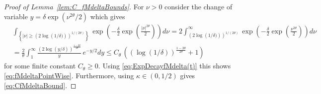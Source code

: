 \documentclass[11pt]{amsart}
\newcommand{\1}{\mathbbm{1}}
\theoremstyle{plain}
\theoremstyle{definition}
\theoremstyle{remark}
\numberwithin{equation}{section}
\begin{document}
\begin{proof} [Proof of Lemma~\ref{lem:C_fMdeltaBounds}]
For $\nu>0$  consider the change of variable $y = \delta\exp\left(\nu^{2\theta}/2\right)$ which gives
\begin{align*}
  &\int_{\left\{|\nu|\ge (2\log\left(1/\delta)\right))^{1/(2\theta)}\right\}} \exp\left(-\frac{\delta}{2}\exp\left(\frac{|\nu|^{2\theta}}{2}\right)\right)d\nu =2\int^{\infty}_{(2\log\left(1/\delta)\right))^{1/(2\theta)}} \exp\left(-\frac{\delta}{2}\exp\left(\frac{\nu^{2\theta}}{2}\right)\right)d\nu\\&=\frac{2}{\theta}\int^{\infty}_{1} \frac{(2\log(y/\delta))^{\tfrac{1-2\theta}{2\theta}}}{y}\,e^{-y/2}dy  \le C_\theta\,\left( (\log(1/\delta))^{\tfrac{1-2\theta}{2\theta}} +1\right)
\end{align*}
for some finite constant $C_\theta\ge 0.$ Using \eqref{eq:ExpDecayfMdelta(t)} this shows \eqref{eq:fMdeltaPointWise}. Furthermore, using $\kappa\in(0,1/2)$ gives \eqref{eq:CfMdeltaBound}.

\end{proof}
\end{document}
